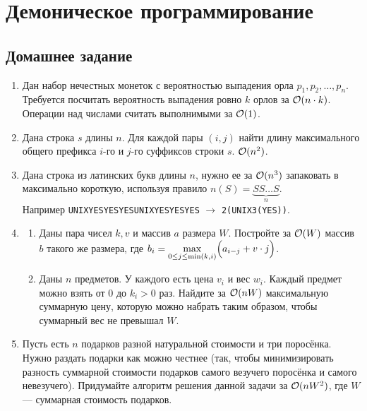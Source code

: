 \section{Демоническое программирование}

\subsection{Домашнее задание}

\begin{enumerate}

  \item
    Дан набор нечестных монеток с вероятностью выпадения орла
    $p_1, p_2, \dots, p_n$. Требуется посчитать вероятность выпадения
    ровно $k$ орлов за $\mathcal{O}(n \cdot k)$. Операции над числами считать
    выполнимыми за $\mathcal{O}(1)$.

  \item
    Дана строка $s$ длины $n$. Для каждой пары $(i, j)$ найти длину максимального
    общего префикса $i$-го и $j$-го суффиксов строки $s$. $\mathcal{O}(n^2)$.

  \item
    Дана строка из латинских букв длины $n$, нужно ее за $\mathcal{O}(n^3)$ запаковать в максимально короткую, используя правило
    $n(S) = \underbrace{SS{\dots}S}_{n}$. \\ Например \texttt{UNIXYESYESYESUNIXYESYESYES} $\rightarrow$ \texttt{2(UNIX3(YES))}.

  \item
    \begin{enumerate}
      \item Даны пара чисел $k, v$ и массив $a$ размера $W$. Постройте за $\mathcal{O}(W)$ массив $b$ такого же размера, где $b_i = \max\limits_{0\leq j \leq \min(k, i)} \Bigl( a_{i - j} + v\cdot j \Bigr)$.
      \item Даны $n$ предметов. У каждого есть цена $v_i$ и вес $w_i$. Каждый предмет можно взять от $0$ до $k_i > 0$ раз. Найдите за $\mathcal{O}(nW)$ максимальную суммарную цену, которую можно набрать таким образом, чтобы суммарный вес не превышал $W$.
    \end{enumerate}

  \item
 	Пусть есть $n$ подарков разной натуральной стоимости и три поросёнка. Нужно
    раздать подарки как можно честнее (так, чтобы минимизировать
    разность суммарной стоимости подарков самого везучего поросёнка и
    самого невезучего). Придумайте алгоритм решения данной задачи за
    $\mathcal{O}(nW^2)$, где $W$ --- суммарная стоимость подарков.


\end{enumerate}
